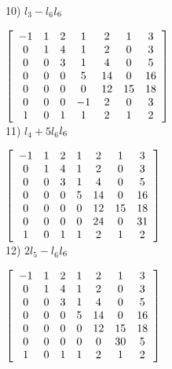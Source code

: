 \documentclass{article}
\begin{document}
 10) $l_{3} - l_{6} $\to$ l_{6}\\ 
\newline$

$\left[\begin{array}{ccccccc}
-1 &  1 &  2 &  1 &  2 &  1 &  3 \\
0  &  1 &  4 &  1 &  2 &  0 &  3 \\
0  &  0 &  3 &  1 &  4 &  0 &  5 \\     
0  &  0 &  0 &  5 &  14&  0 &  16\\ 
0  &  0 &  0 &  0 &  12& 15 &  18\\ 
0  &  0 &  0 & -1 &   2&  0 &  3\\ 
1  &  0 &  1 &  1 &  2 &  1 &   2 \\ 
 \end{array}\right]\\
  \newline$\\
  
11) $l_{4} + 5l_{6} $\to$ l_{6}\\ 
\newline$

$\left[\begin{array}{ccccccc}
-1 &  1 &  2 &  1 &  2 &  1 &  3 \\
0  &  1 &  4 &  1 &  2 &  0 &  3 \\
0  &  0 &  3 &  1 &  4 &  0 &  5 \\     
0  &  0 &  0 &  5 &  14&  0 &  16\\ 
0  &  0 &  0 &  0 &  12& 15 &  18\\ 
0  &  0 &  0 &  0 &  24&  0 &  31\\ 
1  &  0 &  1 &  1 &  2 &  1 &   2 \\ 
 \end{array}\right]\\
  \newline$\\
  
12) $2l_{5} - l_{6} $\to$ l_{6}\\ 
\newline$

$\left[\begin{array}{ccccccc}
-1 &  1 &  2 &  1 &  2 &  1 &  3 \\
0  &  1 &  4 &  1 &  2 &  0 &  3 \\
0  &  0 &  3 &  1 &  4 &  0 &  5 \\     
0  &  0 &  0 &  5 &  14&  0 &  16\\ 
0  &  0 &  0 &  0 &  12& 15 &  18\\ 
0  &  0 &  0 &  0 &  0&  30 &   5\\ 
1  &  0 &  1 &  1 &  2 &  1 &   2 \\ 
 \end{array}\right]\\
  \newline$\\
  
\end{document}
